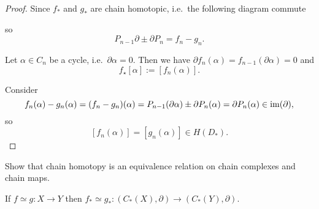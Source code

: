 \documentclass[a4paper,11pt]{article}
\begin{document}
	\begin{proof}
		Since $f_*$ and $g_*$ are chain homotopic, i.e.\ the following diagram commute
		\begin{center}
		\end{center}
		so
		\[
			P _{n-1} \partial \pm \partial P_n = f_n - g_n.
		\]
		
		Let $\alpha \in C_n$ be a cycle, i.e.\ $\partial \alpha = 0$. Then we have $\partial f_n(\alpha) = f _{n-1}(\partial \alpha) = 0$ and
		\[
			f_\star [\alpha] := [f_n (\alpha)].
		\]

		Consider
		\[
			f_n (\alpha) - g_n (\alpha) = (f_n - g_n) (\alpha) = P _{n-1} (\partial \alpha) \pm \partial P_n (\alpha) = \partial P_n (\alpha) \in \operatorname{im}(\partial),
		\]
		so
		\[
			[f_n(\alpha)] = [g_n(\alpha)] \in H(D_*).
		\]
	\end{proof}

	\begin{exer}
		Show that chain homotopy is an equivalence relation on chain complexes and chain maps.
	\end{exer}
	
	\begin{thm}
		If $f \simeq g : X \to Y$ then $f_* \simeq g_* : (C_*(X),\partial) \to (C_*(Y),\partial)$. 
	\end{thm}
	
\end{document}
